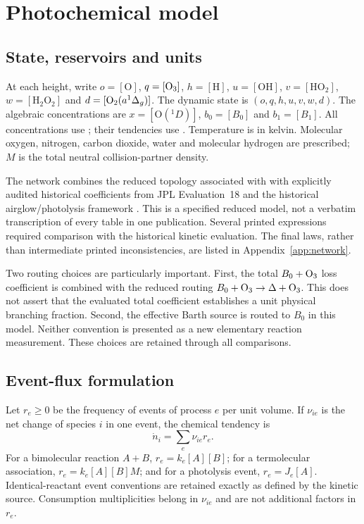 \chapter{Photochemical model}\label{ch:chemistry}
\section{State, reservoirs and units}
At each height, write $o=[\mathrm{O}]$, $q=[\mathrm{O}_3]$, $h=[\mathrm{H}]$, $u=[\mathrm{OH}]$, $v=[\mathrm{HO_2}]$, $w=[\mathrm{H_2O_2}]$ and $d=[\mathrm{O}_2(a^1\Delta_g)]$. The dynamic state is $(o,q,h,u,v,w,d)$. The algebraic concentrations are $x=[\mathrm{O}(^1D)]$, $b_0=[B_0]$ and $b_1=[B_1]$. All concentrations use \concunit; their tendencies use \rateunit. Temperature is in kelvin. Molecular oxygen, nitrogen, carbon dioxide, water and molecular hydrogen are prescribed; $M$ is the total neutral collision-partner density.

The network combines the reduced topology associated with \citet{li2020} with explicitly audited historical coefficients from JPL Evaluation~18 \citep{jpl18} and the historical airglow/photolysis framework \citep{li2017,brasseur2005}. This is a specified reduced model, not a verbatim transcription of every table in one publication. Several printed expressions required comparison with the historical kinetic evaluation. The final laws, rather than intermediate printed inconsistencies, are listed in Appendix~\ref{app:network}.

Two routing choices are particularly important. First, the total $B_0+\mathrm{O}_3$ loss coefficient is combined with the reduced routing $B_0+\mathrm{O}_3\rightarrow\Delta+\mathrm{O}_3$. This does not assert that the evaluated total coefficient establishes a unit physical branching fraction. Second, the effective Barth source is routed to $B_0$ in this model. Neither convention is presented as a new elementary reaction measurement. These choices are retained through all comparisons.

\section{Event-flux formulation}
Let $r_e\geq0$ be the frequency of events of process $e$ per unit volume. If $\nu_{ie}$ is the net change of species $i$ in one event, the chemical tendency is
\begin{equation}\dot n_i=\sum_e\nu_{ie}r_e.\label{eq:eventsum}\end{equation}
For a bimolecular reaction $A+B$, $r_e=k_e[A][B]$; for a termolecular association, $r_e=k_e[A][B]M$; and for a photolysis event, $r_e=J_e[A]$. Identical-reactant event conventions are retained exactly as defined by the kinetic source. Consumption multiplicities belong in $\nu_{ie}$ and are not additional factors in $r_e$.

